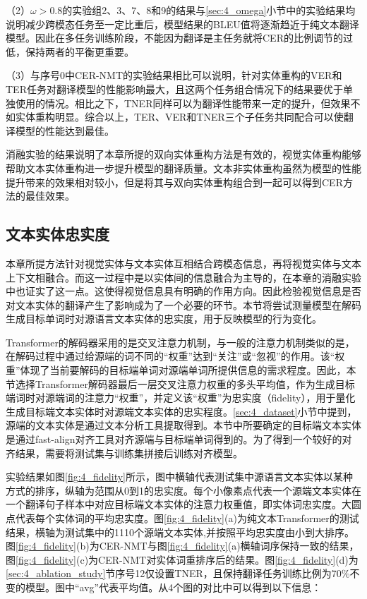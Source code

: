 （2）$\omega>0.8$的实验组2、3、7、8和9的结果与\ref{sec:4_omega}小节中的实验结果均说明减少跨模态任务至一定比重后，模型结果的BLEU值将逐渐趋近于纯文本翻译模型。因此在多任务训练阶段，不能因为翻译是主任务就将CER的比例调节的过低，保持两者的平衡更重要。

（3）与序号0中CER-NMT的实验结果相比可以说明，针对实体重构的VER和TER任务对翻译模型的性能影响最大，且这两个任务组合情况下的结果要优于单独使用的情况。相比之下，TNER同样可以为翻译性能带来一定的提升，但效果不如实体重构明显。综合以上，TER、VER和TNER三个子任务共同配合可以使翻译模型的性能达到最佳。

消融实验的结果说明了本章所提的双向实体重构方法是有效的，视觉实体重构能够帮助文本实体重构进一步提升模型的翻译质量。文本非实体重构虽然为模型的性能提升带来的效果相对较小，但是将其与双向实体重构组合到一起可以得到CER方法的最佳效果。

\subsection{文本实体忠实度}
\label{sec:4_fidelity}
本章所提方法针对视觉实体与文本实体互相结合跨模态信息，再将视觉实体与文本上下文相融合。而这一过程中是以实体间的信息融合为主导的，在本章的消融实验中也证实了这一点。这使得视觉信息具有明确的作用方向。因此检验视觉信息是否对文本实体的翻译产生了影响成为了一个必要的环节。本节将尝试测量模型在解码生成目标单词时对源语言文本实体的忠实度，用于反映模型的行为变化。


Transformer的解码器采用的是交叉注意力机制，与一般的注意力机制类似的是，在解码过程中通过给源端的词不同的“权重”达到“关注”或“忽视”的作用。该“权重”体现了当前要解码的目标端单词对源端单词所提供信息的需求程度。因此，本节选择Transformer解码器最后一层交叉注意力权重的多头平均值，作为生成目标端词时对源端词的注意力“权重”，并定义该“权重”为忠实度（fidelity），用于量化生成目标端文本实体时对源端文本实体的忠实程度。\ref{sec:4_dataset}小节中提到，源端的文本实体是通过文本分析工具提取得到。本节中所要确定的目标端文本实体是通过fast-align对齐工具对齐源端与目标端单词得到的。为了得到一个较好的对齐结果，需要将测试集与训练集拼接后训练对齐模型。

实验结果如图\ref{fig:4_fidelity}所示，图中横轴代表测试集中源语言文本实体以某种方式的排序，纵轴为范围从0到1的忠实度。每个小像素点代表一个源端文本实体在一个翻译句子样本中对应目标端文本实体的注意力权重值，即实体词忠实度。大圆点代表每个实体词的平均忠实度。图\ref{fig:4_fidelity}(a)为纯文本Transformer的测试结果，横轴为测试集中的1110个源端文本实体,并按照平均忠实度由小到大排序。图\ref{fig:4_fidelity}(b)为CER-NMT与图\ref{fig:4_fidelity}(a)横轴词序保持一致的结果，图\ref{fig:4_fidelity}(c)为CER-NMT对实体词重排序后的结果。图\ref{fig:4_fidelity}(d)为\ref{sec:4_ablation_study}节序号12仅设置TNER，且保持翻译任务训练比例为70\%不变的模型。图中“avg”代表平均值。从4个图的对比中可以得到以下信息：


